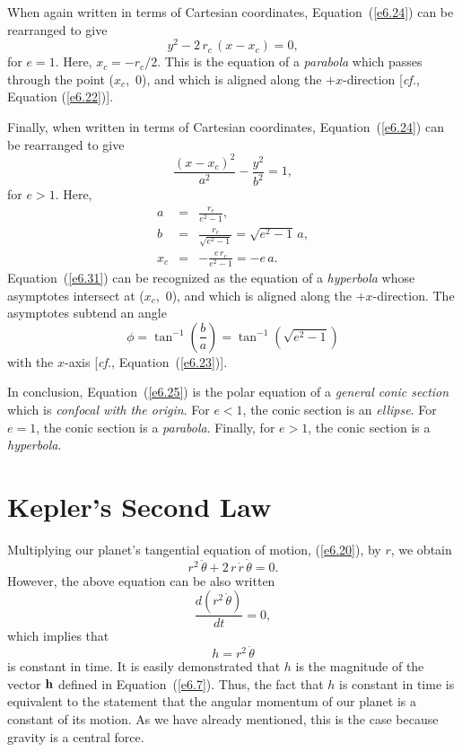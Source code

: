 When again written in terms of Cartesian coordinates, Equation~(\ref{e6.24})
can be rearranged to give
\begin{equation}
y^2 - 2\,r_c\,(x-x_c) = 0,
\end{equation}
for $e=1$. Here, $x_c = -r_c/2$. This is the equation of a {\em parabola}
which passes through the point ($x_c$,\, $0$), and which is aligned
along the $+x$-direction [{\em cf.}, Equation (\ref{e6.22})].

Finally, when written in terms of Cartesian coordinates, Equation~(\ref{e6.24})
can be rearranged to give
\begin{equation}\label{e6.31}
\frac{(x-x_c)^2}{a^2}  - \frac{y^2}{b^2} = 1,
\end{equation}
for $e>1$. Here,
\begin{eqnarray}
a &=& \frac{r_c}{e^2-1},\\[0.5ex]
b &=& \frac{r_c}{\sqrt{e^2-1}}=\sqrt{e^2-1}\,a,\\[0.5ex]
x_c &=& -\frac{e\,r_c}{e^2-1}=-e\,a.
\end{eqnarray}
Equation~(\ref{e6.31}) can be recognized as the equation of a {\em hyperbola} whose asymptotes intersect at ($x_c$,\, $0$), and which
is aligned along the $+x$-direction. The asymptotes subtend an angle
\begin{equation}
\phi = \tan^{-1}\left(\frac{b}{a}\right) = \tan^{-1}(\sqrt{e^2-1})
\end{equation}
with the $x$-axis [{\em cf.}, Equation~(\ref{e6.23})].

In conclusion, Equation~(\ref{e6.25}) is the   polar equation of a {\em general conic
section}\/ which is {\em confocal with the origin}. For $e<1$, the conic section
is an {\em ellipse}. For $e=1$, the conic section is a {\em parabola}. Finally, for
$e>1$, the conic section is a {\em hyperbola}.

\section{Kepler's Second Law}
Multiplying our planet's tangential equation of motion, (\ref{e6.20}),
by $r$, we obtain
\begin{equation}
r^2\,\ddot{\theta} + 2\,r\,\dot{r}\,\dot{\theta} = 0.
\end{equation}
However, the above equation can be also written
\begin{equation}
\frac{d(r^2\,\dot{\theta})}{dt} = 0,
\end{equation}
which implies that
\begin{equation}\label{e6.38}
h = r^2\,\dot{\theta}
\end{equation}
is constant in time. It is easily demonstrated that $h$ is the magnitude
of the vector ${\bf h}$ defined in Equation~(\ref{e6.7}). Thus, the fact that
$h$ is constant in time is equivalent to the statement that the angular
momentum of our planet is a constant of its motion. As we have already mentioned, this is the case
because gravity is a central force.


